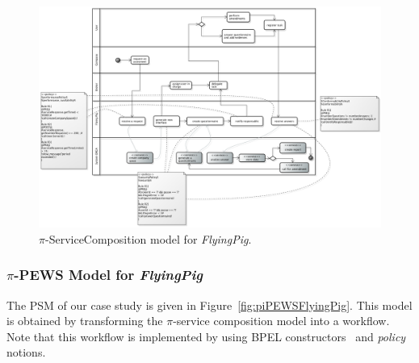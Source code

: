 \documentclass{singlecol-new}
\theoremstyle{TH}{
\newtheorem{lemma}{Lemma}
\newtheorem{theorem}[lemma]{Theorem}
\newtheorem{corrolary}[lemma]{Corrolary}
\newtheorem{conjecture}[lemma]{Conjecture}
\newtheorem{proposition}[lemma]{Proposition}
\newtheorem{claim}[lemma]{Claim}
\newtheorem{stheorem}[lemma]{Wrong Theorem}
\newtheorem{algorithm}{Algorithm}
}
\theoremstyle{THrm}{
\newtheorem{definition}{Definition}[section]
\newtheorem{question}{Question}[section]
\newtheorem{remark}{Remark}
\newtheorem{scheme}{Scheme}
}
\theoremstyle{THhit}{
\newtheorem{case}{Case}[section]
}
\theoremstyle{THhsl}{
\newtheorem{example}{Example}
}
\def\FlyingPig{\textsl{FlyingPig}\xspace}
\begin{document}
\begin{figure}[h]
\centering
\includegraphics[width=1.0\textwidth]{./figures/ServiceCompositionGeneralCut}
\caption{$\pi$-ServiceComposition model for \FlyingPig.\label{fig:PiServiceCompositionModel}}
\end{figure}


\subsubsection{$\pi$-PEWS Model for \FlyingPig}

The  PSM of our case study is given in Figure~\ref{fig:piPEWSFlyingPig}. This model is obtained by transforming the $\pi$-service composition model into a workflow.
Note that this workflow is implemented by using  BPEL constructors~\cite{BPEL} and \textit{policy} notions.
\end{document}
